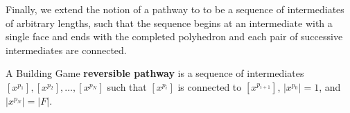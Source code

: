 Finally, we extend the notion of a pathway to to be a sequence of intermediates of arbitrary lengths, such that the sequence begins at an intermediate with a single face and ends with the completed polyhedron and each pair of successive intermediates are connected.
\begin{mydef}
A Building Game \textbf{reversible pathway} is a sequence of intermediates $[x^{p_1}], [x^{p_2}], \dots, [x^{p_N}]$ such that  $[x^{p_i}]$ is connected to $[x^{p_{i+1}}]$, $|x^{p_0}| = 1$, and $|x^{p_N}| = |F|$.
\end{mydef}


%
%
%
%



